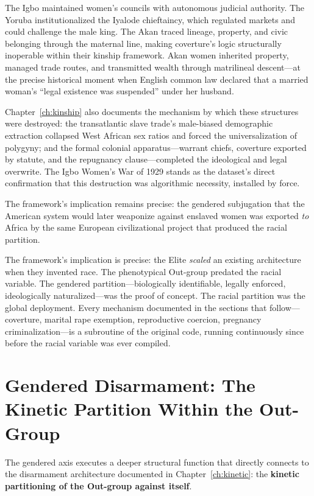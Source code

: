 The Igbo maintained women's councils with autonomous judicial authority. The Yoruba institutionalized the Iyalode chieftaincy, which regulated markets and could challenge the male king. The Akan traced lineage, property, and civic belonging through the maternal line, making coverture's logic structurally inoperable within their kinship framework. Akan women inherited property, managed trade routes, and transmitted wealth through matrilineal descent---at the precise historical moment when English common law declared that a married woman's ``legal existence was suspended'' under her husband.

Chapter~\ref{ch:kinship} also documents the mechanism by which these structures were destroyed: the transatlantic slave trade's male-biased demographic extraction collapsed West African sex ratios and forced the universalization of polygyny; and the formal colonial apparatus---warrant chiefs, coverture exported by statute, and the repugnancy clause---completed the ideological and legal overwrite. The Igbo Women's War of 1929 stands as the dataset's direct confirmation that this destruction was algorithmic necessity, installed by force.

The framework's implication remains precise: the gendered subjugation that the American system would later weaponize against enslaved women was exported \textit{to} Africa by the same European civilizational project that produced the racial partition.

The framework's implication is precise: the Elite \textit{scaled} an existing architecture when they invented race. The phenotypical Out-group predated the racial variable. The gendered partition---biologically identifiable, legally enforced, ideologically naturalized---was the proof of concept. The racial partition was the global deployment. Every mechanism documented in the sections that follow---coverture, marital rape exemption, reproductive coercion, pregnancy criminalization---is a subroutine of the original code, running continuously since before the racial variable was ever compiled.

\section{Gendered Disarmament: The Kinetic Partition Within the Out-Group}

The gendered axis executes a deeper structural function that directly connects to the disarmament architecture documented in Chapter~\ref{ch:kinetic}: the \textbf{kinetic partitioning of the Out-group against itself}.

